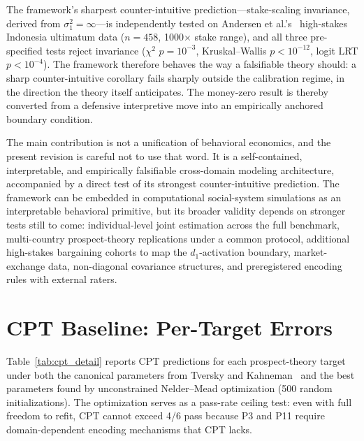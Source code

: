 \documentclass[journal]{IEEEtran}
\begin{document}
The framework's sharpest counter-intuitive prediction---stake-scaling invariance, derived from $\sigma_1^2=\infty$---is independently tested on Andersen et al.'s~\cite{andersen2011} high-stakes Indonesia ultimatum data ($n=458$, 1000$\times$ stake range), and all three pre-specified tests reject invariance ($\chi^2$ $p=10^{-3}$, Kruskal--Wallis $p<10^{-12}$, logit LRT $p<10^{-4}$).
The framework therefore behaves the way a falsifiable theory should: a sharp counter-intuitive corollary fails sharply outside the calibration regime, in the direction the theory itself anticipates.
The money-zero result is thereby converted from a defensive interpretive move into an empirically anchored boundary condition.

The main contribution is not a unification of behavioral economics, and the present revision is careful not to use that word.
It is a self-contained, interpretable, and empirically falsifiable cross-domain modeling architecture, accompanied by a direct test of its strongest counter-intuitive prediction.
The framework can be embedded in computational social-system simulations as an interpretable behavioral primitive, but its broader validity depends on stronger tests still to come: individual-level joint estimation across the full benchmark, multi-country prospect-theory replications under a common protocol, additional high-stakes bargaining cohorts to map the $d_1$-activation boundary, market-exchange data, non-diagonal covariance structures, and preregistered encoding rules with external raters.
\appendices
\section{CPT Baseline: Per-Target Errors}
\label{app:cpt}

Table~\ref{tab:cpt_detail} reports CPT predictions for each prospect-theory target under both the canonical parameters from Tversky and Kahneman~\cite{tversky1992} and the best parameters found by unconstrained Nelder--Mead optimization (500 random initializations).
The optimization serves as a pass-rate ceiling test: even with full freedom to refit, CPT cannot exceed 4/6 pass because P3 and P11 require domain-dependent encoding mechanisms that CPT lacks.
\end{document}
